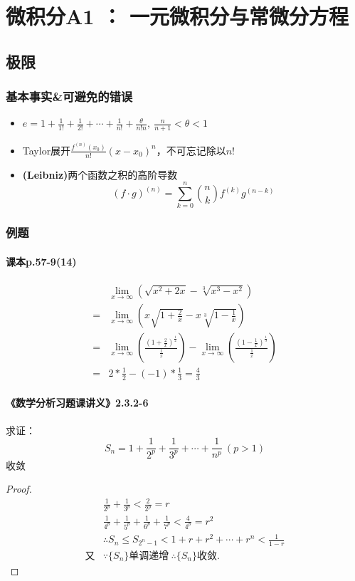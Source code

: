\documentclass[./main.tex]{subfiles}
\begin{document}
\chapter{微积分A1 ： 一元微积分与常微分方程}
\section{极限}
\subsection{基本事实\&可避免的错误}
\begin{itemize}
  \item $e=1+\frac{1}{1!}+\frac{1}{2!}+\cdots+\frac{1}{n!}+\frac{\theta}{n!n},\ \frac{n}{n+1}<\theta<1$
  \item Taylor展开$\frac{f^{(n)}(x_0)}{n!}(x-x_0)^n$，不可忘记除以$n!$
  \item \textbf{(Leibniz)}两个函数之积的高阶导数
  $$(f\cdot g)^{(n)}=\sum_{k=0}^n\binom{n}{k}f^{(k)}g^{(n-k)}$$
\end{itemize}
\subsection{例题}
\subsubsection{课本p.57-9(14)}\vspace{-2em}
\begin{align*}
  &\lim\limits_{x\rightarrow\infty}(\sqrt{x^2+2x}-\sqrt[3]{x^3-x^2})\\
  =&\lim\limits_{x\rightarrow \infty}(x\sqrt{1+\frac{2}{x}}-x\sqrt[3]{1-\frac{1}{x}})\\
  =&\lim\limits_{x\rightarrow \infty}(\frac{(1+\frac{2}{x})^\frac{1}{2}}{\frac{1}{x}})
  - \lim\limits_{x\rightarrow \infty}(\frac{(1-\frac{1}{x})^\frac{1}{3}}{\frac{1}{x}}) \\
  =&2*\frac{1}{2}-(-1)*\frac{1}{3}=\frac{4}{3}
\end{align*}
\subsubsection{《数学分析习题课讲义》2.3.2-6}
\noindent 求证：
\begin{equation}
S_n=1+\frac{1}{2^p}+\frac{1}{3^p}+\cdots+\frac{1}{n^p}\ (p>1)
\end{equation}
收敛
\begin{proof}
\begin{align*}
&\frac{1}{2^p}+\frac{1}{3^p}<\frac{2}{2^p}=r\\
&\frac{1}{4^p}+\frac{1}{5^p}+\frac{1}{6^p}+\frac{1}{7^p}<\frac{4}{4^p}=r^2\\
&\therefore S_n\le S_{2^n-1}<1+r+r^2+\cdots+r^n<\frac{1}{1-r}\\
\text{又}&\because \{S_n\}\text{单调递增}\ \therefore \{S_n\}\text{收敛}.
\end{align*}
\end{proof}
\end{document}
